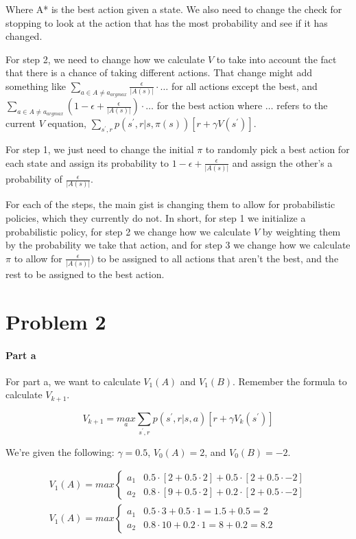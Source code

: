 \documentclass[12pt]{article}
\begin{document}
Where A* is the best action given a state. We also need to change the check for stopping to look at the action that has the most probability and see if it has changed.

For step 2, we need to change how we calculate $V$ to take into account the fact that there is a chance of taking different actions. That change might add something like $\sum_{a\in A \neq a_{argmax}} \frac{\epsilon}{|A(s)|} \cdot \dots$ for all actions except the best, and $\sum_{a\in A \neq a_{argmax}} (1 - \epsilon + \frac{\epsilon}{|A(s)|}) \cdot \dots$ for the best action where $\dots$ refers to the current $V$ equation, $\sum_{s^\prime, r} p(s^\prime, r|s, \pi(s))[r + \gamma V(s^\prime)]$.

For step 1, we just need to change the initial $\pi$ to randomly pick a best action for each state and assign its probability to $1 - \epsilon + \frac{\epsilon}{|A(s)|}$ and assign the other's a probability of $\frac{\epsilon}{|A(s)|}$.

For each of the steps, the main gist is changing them to allow for probabilistic policies, which they currently do not. In short, for step 1 we initialize a probabilistic policy, for step 2 we change how we calculate $V$ by weighting them by the probability we take that action, and for step 3 we change how we calculate $\pi$ to allow for $\frac{\epsilon}{|A(s)|})$ to be assigned to all actions that aren't the best, and the rest to be assigned to the best action.

\section{Problem 2}

\paragraph{Part a} For part a, we want to calculate $V_1(A)$ and $V_1(B)$. Remember the formula to calculate $V_{k+1}$.

$$
  V_{k+1} = \underset{a}{max} \sum_{s^\prime, r} p(s^\prime, r|s, a)[r + \gamma V_k(s^\prime)]
$$

We're given the following: $\gamma = 0.5$, $V_0(A) = 2$, and $V_0(B) = -2$.

\begin{gather*}
  V_1(A) = max \begin{cases}
    a_1 & 0.5 \cdot [2 + 0.5 \cdot 2] + 0.5 \cdot [2 + 0.5 \cdot -2] \\
    a_2 & 0.8 \cdot [9 + 0.5 \cdot 2] + 0.2 \cdot [2 + 0.5 \cdot -2]
  \end{cases} \\
  V_1(A) = max \begin{cases}
    a_1 & 0.5 \cdot 3 + 0.5 \cdot 1 = 1.5 + 0.5 = 2  \\
    a_2 & 0.8 \cdot 10 + 0.2 \cdot 1 = 8 + 0.2 = 8.2
  \end{cases}
\end{gather*}
\end{document}
